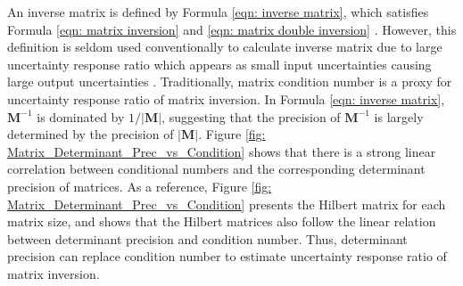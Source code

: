 \documentclass[twoside]{article}
\numberwithin{equation}{section}
\begin{document}
An inverse matrix is defined by Formula \eqref{eqn: inverse matrix}, which satisfies Formula \eqref{eqn: matrix inversion} and \eqref{eqn: matrix double inversion} \cite{Linear_Algebra}.
However, this definition is seldom used conventionally to calculate inverse matrix due to large uncertainty response ratio which appears as small input uncertainties causing large output uncertainties \cite{Numerical_Recipes}\cite{Linear_Algebra}.
Traditionally, matrix condition number \cite{Linear_Algebra} is a proxy for uncertainty response ratio of matrix inversion.
In Formula \eqref{eqn: inverse matrix}, $\mathbf{M}^{-1}$ is dominated by $1/|\mathbf{M}|$, suggesting that the precision of $\mathbf{M}^{-1}$ is largely determined by the precision of $|\mathbf{M}|$.
Figure \ref{fig: Matrix_Determinant_Prec_vs_Condition} shows that there is a strong linear correlation between conditional numbers and the corresponding determinant precision of matrices.
As a reference, Figure \ref{fig: Matrix_Determinant_Prec_vs_Condition} presents the Hilbert matrix \cite{Linear_Algebra} for each matrix size, and shows that the Hilbert matrices also follow the linear relation between determinant precision and condition number.
Thus, determinant precision can replace condition number to estimate uncertainty response ratio of matrix inversion.
\end{document}
